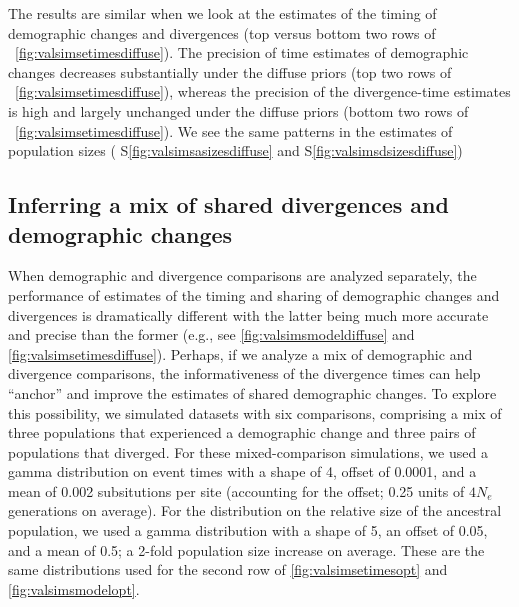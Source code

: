 \ifembed{

}{}

The results are similar when we look at the estimates of the timing of
demographic changes and divergences
(top versus bottom two rows of \fig{}~\ref{fig:valsimsetimesdiffuse}).
The precision of time estimates of demographic changes decreases
substantially under the diffuse priors
(top two rows of \fig{}~\ref{fig:valsimsetimesdiffuse}),
whereas the precision of the divergence-time estimates
is high and largely unchanged under the diffuse priors
(bottom two rows of \fig{}~\ref{fig:valsimsetimesdiffuse}).
We see the same patterns in the estimates of population sizes
(\figs
S\ref{fig:valsimsasizesdiffuse}
and
S\ref{fig:valsimsdsizesdiffuse})

\ifembed{

}{}


\subsection{Inferring a mix of shared divergences and demographic changes}

When demographic and divergence comparisons are analyzed separately, the
performance of estimates of the timing and sharing of demographic changes and
divergences is dramatically different with the latter being much more accurate
and precise than the former
(e.g., see
\figs
\ref{fig:valsimsmodeldiffuse}
and
\ref{fig:valsimsetimesdiffuse}).
Perhaps, if we analyze a mix of demographic and divergence comparisons,
the informativeness of the divergence times can help ``anchor'' and
improve the estimates of shared demographic changes.
To explore this possibility, we simulated datasets with six comparisons,
comprising a mix of three populations that experienced a demographic change and
three pairs of populations that diverged.
For these mixed-comparison simulations, we used a gamma distribution on event
times with a shape of 4, offset of 0.0001, and a mean of 0.002 subsitutions per
site (accounting for the offset; 0.25 units of $4N_e$ generations on average).
For the distribution on the relative size of the ancestral population,
we used a gamma distribution with a shape of 5, an offset of 0.05, and a mean
of 0.5; a 2-fold population size increase on average.
These are the same distributions used for the second row of
\figs
\ref{fig:valsimsetimesopt}
and
\ref{fig:valsimsmodelopt}.


